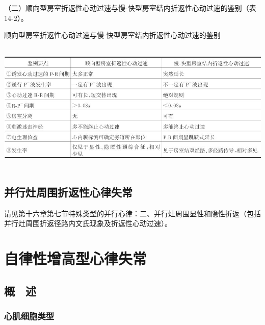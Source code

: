 （二）顺向型房室折返性心动过速与慢-快型房室结内折返性心动过速的鉴别（表14-2）。

\begin{table}[htbp]
\centering
\caption{顺向型房室折返性心动过速与慢-快型房室结内折返性心动过速的鉴别}
\label{tab14-2}
\includegraphics[width=6.20833in,height=2.44792in]{./images/Image00266.jpg}
\end{table}

\protect\hypertarget{text00021.htmlux5cux23subid249}{}{}

\section{并行灶周围折返性心律失常}

请见第十六章第七节特殊类型的并行心律：二、并行灶周围显性和隐性折返（包括并行灶周围折返径路内文氏现象及折返性心动过速）。

\protect\hypertarget{text00022.html}{}{}

\protect\hypertarget{text00022.htmlux5cux23chapter22}{}{}

\chapter{自律性增高型心律失常}

\protect\hypertarget{text00022.htmlux5cux23subid250}{}{}

\section{概　述}

\protect\hypertarget{text00022.htmlux5cux23subid251}{}{}

\subsection{心肌细胞类型}

